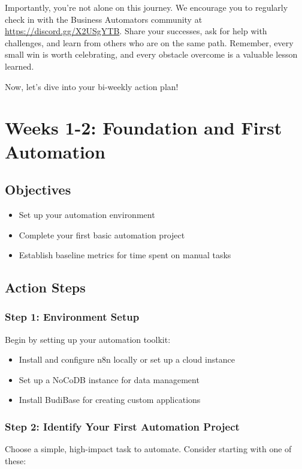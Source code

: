 Importantly, you're not alone on this journey. We encourage you to regularly check in with the Business Automators community at \url{https://discord.gg/X2USgYTB}. Share your successes, ask for help with challenges, and learn from others who are on the same path. Remember, every small win is worth celebrating, and every obstacle overcome is a valuable lesson learned.

Now, let's dive into your bi-weekly action plan!

\section{Weeks 1-2: Foundation and First Automation}

\subsection{Objectives}
\begin{itemize}
    \item Set up your automation environment
    \item Complete your first basic automation project
    \item Establish baseline metrics for time spent on manual tasks
\end{itemize}

\subsection{Action Steps}

\subsubsection{Step 1: Environment Setup}
Begin by setting up your automation toolkit:

\begin{itemize}
    \item Install and configure n8n locally or set up a cloud instance
    \item Set up a NoCoDB instance for data management
    \item Install BudiBase for creating custom applications
\end{itemize}


\subsubsection{Step 2: Identify Your First Automation Project}
Choose a simple, high-impact task to automate. Consider starting with one of these:

